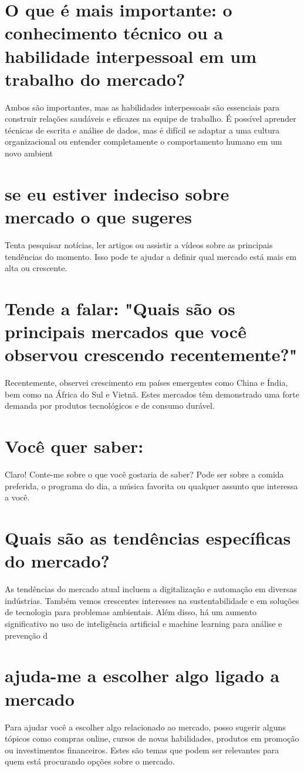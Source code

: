 \documentclass[11pt,a4paper]{article}
\begin{document}
\section{O que é mais importante: o conhecimento técnico ou a habilidade interpessoal em um trabalho do mercado?}
Ambos são importantes, mas as habilidades interpessoais são essenciais para construir relações saudáveis e eficazes na equipe de trabalho. É possível aprender técnicas de escrita e análise de dados, mas é difícil se adaptar a uma cultura organizacional ou entender completamente o comportamento humano em um novo ambient

\section{se eu estiver indeciso sobre mercado o que sugeres}
Tenta pesquisar notícias, ler artigos ou assistir a vídeos sobre as principais tendências do momento. Isso pode te ajudar a definir qual mercado está mais em alta ou crescente.

\section{Tende a falar: "Quais são os principais mercados que você observou crescendo recentemente?"}
Recentemente, observei crescimento em países emergentes como China e Índia, bem como na África do Sul e Vietnã. Estes mercados têm demonstrado uma forte demanda por produtos tecnológicos e de consumo durável.

\section{Você quer saber:}
Claro! Conte-me sobre o que você gostaria de saber? Pode ser sobre a comida preferida, o programa do dia, a música favorita ou qualquer assunto que interessa a você.

\section{Quais são as tendências específicas do mercado?}
As tendências do mercado atual incluem a digitalização e automação em diversas indústrias. Também vemos crescentes interesses na sustentabilidade e em soluções de tecnologia para problemas ambientais. Além disso, há um aumento significativo no uso de inteligência artificial e machine learning para análise e prevenção d

\section{ajuda-me a escolher algo ligado a mercado}
Para ajudar você a escolher algo relacionado ao mercado, posso sugerir alguns tópicos como compras online, cursos de novas habilidades, produtos em promoção ou investimentos financeiros. Estes são temas que podem ser relevantes para quem está procurando opções sobre o mercado.
\end{document}
